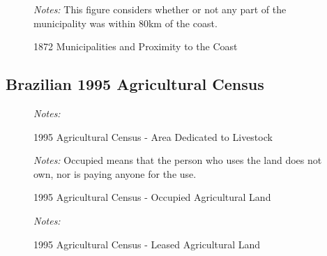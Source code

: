 \documentclass{article}
\begin{document}
\begin{figure}
  \caption{1872 Municipalities and Proximity to the Coast}
  \begin{center}
  \textit{Notes:} This figure considers whether or not any part of the municipality was within 80km of the coast.
  \end{center}
  \label{fig:sugarcane_1970}
\end{figure}
\clearpage

\subsection*{Brazilian 1995 Agricultural Census}

\begin{figure}[h!]
  \caption{1995 Agricultural Census - Area Dedicated to Livestock}
  \begin{center}
  \textit{Notes:} 
  \end{center}
  \label{fig:livestock_area_1995}
\end{figure}
\clearpage

\begin{figure}[h!]
  \caption{1995 Agricultural Census - Occupied Agricultural Land}
  \begin{center}
  \textit{Notes:} Occupied means that the person who uses the land does not own, nor is paying anyone for the use.  
  \end{center}
  \label{fig:occupied_area_1995}
\end{figure}
\clearpage

\begin{figure}[h!]
  \caption{1995 Agricultural Census - Leased Agricultural Land}
  \begin{center}
  \textit{Notes:} 
  \end{center}
  \label{fig:leased_area_1995}
\end{figure}
\clearpage
\end{document}

